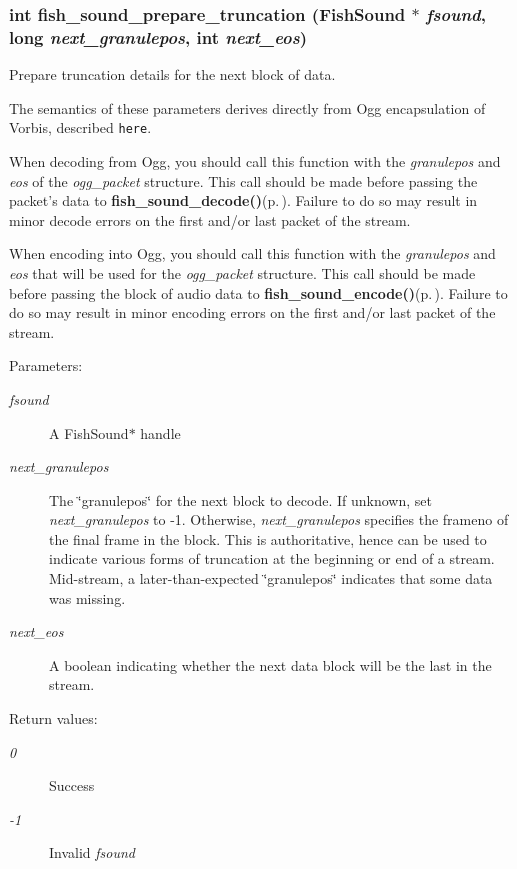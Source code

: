 \subsubsection{\setlength{\rightskip}{0pt plus 5cm}int fish\_\-sound\_\-prepare\_\-truncation ({\bf Fish\-Sound} $\ast$ {\em fsound}, long {\em next\_\-granulepos}, int {\em next\_\-eos})}\label{fishsound_8h_a17}


Prepare truncation details for the next block of data. 

The semantics of these parameters derives directly from Ogg encapsulation of Vorbis, described {\tt here}.

When decoding from Ogg, you should call this function with the {\em granulepos\/} and {\em eos\/} of the {\em ogg\_\-packet\/} structure. This call should be made before passing the packet's data to {\bf fish\_\-sound\_\-decode()}{\rm (p.\,\pageref{fishsound_8h_a7})}. Failure to do so may result in minor decode errors on the first and/or last packet of the stream.

When encoding into Ogg, you should call this function with the {\em granulepos\/} and {\em eos\/} that will be used for the {\em ogg\_\-packet\/} structure. This call should be made before passing the block of audio data to {\bf fish\_\-sound\_\-encode()}{\rm (p.\,\pageref{fishsound_8h_a8})}. Failure to do so may result in minor encoding errors on the first and/or last packet of the stream.

\begin{Desc}
\item[Parameters:]
\begin{description}
\item[{\em fsound}]A Fish\-Sound$\ast$ handle \item[{\em next\_\-granulepos}]The \char`\"{}granulepos\char`\"{} for the next block to decode. If unknown, set {\em next\_\-granulepos\/} to -1. Otherwise, {\em next\_\-granulepos\/} specifies the frameno of the final frame in the block. This is authoritative, hence can be used to indicate various forms of truncation at the beginning or end of a stream. Mid-stream, a later-than-expected \char`\"{}granulepos\char`\"{} indicates that some data was missing. \item[{\em next\_\-eos}]A boolean indicating whether the next data block will be the last in the stream. \end{description}
\end{Desc}
\begin{Desc}
\item[Return values:]
\begin{description}
\item[{\em 0}]Success \item[{\em -1}]Invalid {\em fsound\/} \end{description}
\end{Desc}
